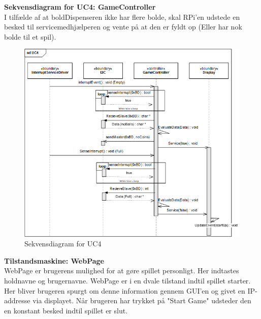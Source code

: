 \documentclass[Arkitektur/System_main.tex]{subfiles}
\begin{document}
\newpage
\textbf{Sekvensdiagram for UC4: GameController}\\
I tilfælde af at boldDispenseren ikke har flere bolde, skal RPi'en udstede en besked til servicemedhjælperen og vente på at den er fyldt op (Eller har nok bolde til et spil).

\begin{figure}[H]
    \centering
    \includegraphics[width=\textwidth]{Arkitektur/Softwarearkitektur/Applikationsmodel/RPi/graphics_RPi/UC4_SD.png}
   \caption{Sekvensdiagram for UC4}
    \label{fig:UC4_SD_RPi}
\end{figure}

\textbf{Tilstandsmaskine: WebPage}\\
WebPage er brugerens mulighed for at gøre spillet personligt. Her indtastes holdnavne og brugernavne. WebPage er i en dvale tilstand indtil spillet starter. Her bliver brugeren spurgt om denne information gennem GUI'en og givet en IP-addresse via displayet. Når brugeren har trykket på "Start Game" udsteder den en konstant besked indtil spillet er slut. 
\end{document}

